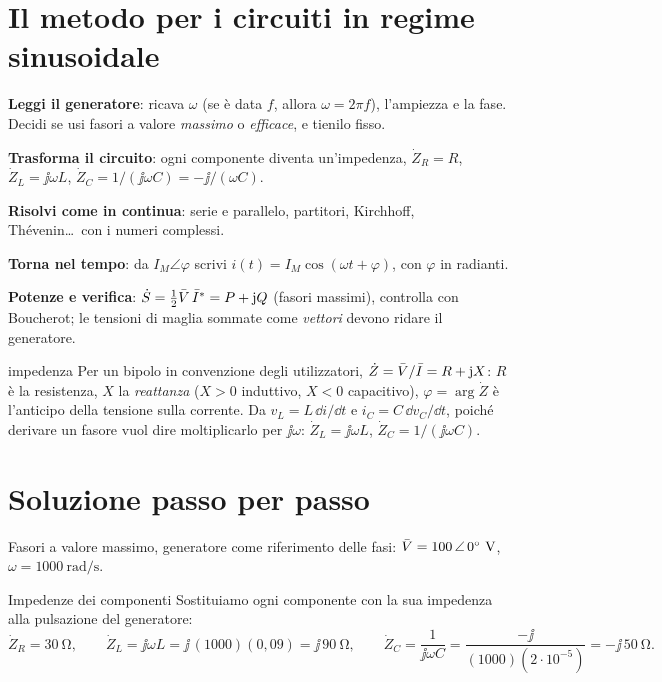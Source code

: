 \documentclass[10pt]{article}
\begin{document}
\section{Il metodo per i circuiti in regime sinusoidale}

\begin{metodo}
  \item \textbf{Leggi il generatore}: ricava $\omega$ (se è data $f$, allora $\omega = 2\pi f$),
        l'ampiezza e la fase. Decidi se usi fasori a valore \emph{massimo} o \emph{efficace}, e tienilo fisso.
  \item \textbf{Trasforma il circuito}: ogni componente diventa un'impedenza,
        $\dot Z_R = R$, $\dot Z_L = \jj\omega L$, $\dot Z_C = 1/(\jj\omega C) = -\jj/(\omega C)$.
  \item \textbf{Risolvi come in continua}: serie e parallelo, partitori, Kirchhoff, Thévenin\ldots\ con i numeri complessi.
  \item \textbf{Torna nel tempo}: da $I_M\angle\varphi$ scrivi $i(t) = I_M\cos(\omega t + \varphi)$, con $\varphi$ in radianti.
  \item \textbf{Potenze e verifica}: $\dot S = \tfrac12 \bar{V}\,\bar{I}^{*} = P + \mathrm{j} Q$ (fasori massimi), controlla con
        Boucherot; le tensioni di maglia sommate come \emph{vettori} devono ridare il generatore.
\end{metodo}

\begin{definizione}{impedenza}
Per un bipolo in convenzione degli utilizzatori, $\dot Z = \bar{V}/\bar{I} = R + \mathrm{j} X$: $R$ è la resistenza,
$X$ la \emph{reattanza} ($X>0$ induttivo, $X<0$ capacitivo), $\varphi = \arg\dot Z$ è l'anticipo della tensione sulla corrente.
Da $v_L = L\,\dd i/\dd t$ e $i_C = C\,\dd v_C/\dd t$, poiché derivare un fasore vuol dire moltiplicarlo per $\jj\omega$:
$\dot Z_L = \jj\omega L$, $\dot Z_C = 1/(\jj\omega C)$.
\end{definizione}


\section{Soluzione passo per passo}

Fasori a valore massimo, generatore come riferimento delle fasi: $\fasore{V} = \polare{100}{0}\ \unit{\volt}$, $\omega = \qty{1000}{\radian\per\second}$.

\begin{passo}{Impedenze dei componenti}
Sostituiamo ogni componente con la sua impedenza alla pulsazione del generatore:
\[
  \dot Z_R = \qty{30}{\ohm}, \qquad
  \dot Z_L = \jj\omega L = \jj\,(1000)(0{,}09) = \jj\,\qty{90}{\ohm}, \qquad
  \dot Z_C = \frac{1}{\jj\omega C} = \frac{-\jj}{(1000)(2\cdot 10^{-5})} = -\jj\,\qty{50}{\ohm}.
\]
\end{passo}
\end{document}
